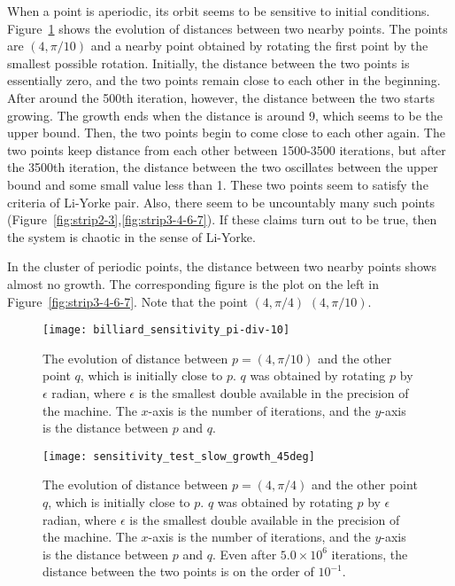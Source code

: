 \documentclass[12pt,twoside]{book}
\begin{document}
When a point is aperiodic, its orbit seems to be sensitive to initial conditions.
Figure~\ref{fig:sensitivity1} shows the evolution of distances between two nearby points.
The points are $(4,\pi/10)$ and a nearby point obtained by rotating the first point by the smallest possible rotation.
Initially, the distance between the two points is essentially zero, and the two points remain close to each other in the beginning.
After around the 500th iteration, however, the distance between the two starts growing.
The growth ends when the distance is around 9, which seems to be the upper bound.
Then, the two points begin to come close to each other again.
The two points keep distance from each other between 1500-3500 iterations, but after the 3500th iteration, the distance between the two oscillates between the upper bound and some small value less than 1.
These two points seem to satisfy the criteria of Li-Yorke pair.
Also, there seem to be uncountably many such points (Figure~\ref{fig:strip2-3},\ref{fig:strip3-4-6-7}).
If these claims turn out to be true, then the system is chaotic in the sense of Li-Yorke.

In the cluster of periodic points, the distance between two nearby points shows almost no growth.
The corresponding figure is the plot on the left in Figure~\ref{fig:strip3-4-6-7}.
Note that the point $(4,\pi/4)$ $(4,\pi/10)$.

\begin{figure}[ht]
  \begin{center}
    \texttt{[image: billiard\_sensitivity\_pi-div-10]}
    \caption{The evolution of distance between $p = (4, \pi/10)$ and the other point $q$, which is initially close to $p$.
      $q$ was obtained by rotating $p$ by $\epsilon$ radian, where $\epsilon$ is the smallest double available in the precision of the machine.
      The $x$-axis is the number of iterations, and the $y$-axis is the distance between $p$ and $q$.
    }
    \label{fig:sensitivity1}
  \end{center}
\end{figure}
\begin{figure}[ht]
  \begin{center}
    \texttt{[image: sensitivity\_test\_slow\_growth\_45deg]}
    \caption{The evolution of distance between $p = (4, \pi/4)$ and the other point $q$, which is initially close to $p$.
      $q$ was obtained by rotating $p$ by $\epsilon$ radian, where $\epsilon$ is the smallest double available in the precision of the machine.
      The $x$-axis is the number of iterations, and the $y$-axis is the distance between $p$ and $q$.
      Even after $5.0 \times 10^6$ iterations, the distance between the two points is on the order of $10^{-1}$.
    }
    \label{fig:sensitivity2}
  \end{center}
\end{figure}




\printindex
\end{document}
